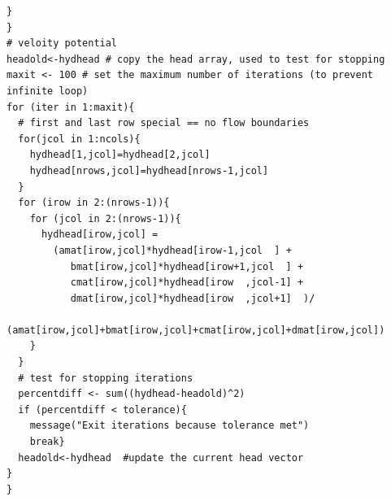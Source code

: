 \begin{lstlisting}[caption= R code demonstrating an Velocity Potential (Aquifer Head) Simulator for 2D Steady Flow.  This code fragment implements the contour plotting \\ , label=lst:velocitypotential]
  }
}
# veloity potential
headold<-hydhead # copy the head array, used to test for stopping 
maxit <- 100 # set the maximum number of iterations (to prevent infinite loop)
for (iter in 1:maxit){
  # first and last row special == no flow boundaries
  for(jcol in 1:ncols){
    hydhead[1,jcol]=hydhead[2,jcol]
    hydhead[nrows,jcol]=hydhead[nrows-1,jcol]
  }
  for (irow in 2:(nrows-1)){
    for (jcol in 2:(nrows-1)){
      hydhead[irow,jcol] = 
        (amat[irow,jcol]*hydhead[irow-1,jcol  ] +
           bmat[irow,jcol]*hydhead[irow+1,jcol  ] +
           cmat[irow,jcol]*hydhead[irow  ,jcol-1] +
           dmat[irow,jcol]*hydhead[irow  ,jcol+1]  )/
        (amat[irow,jcol]+bmat[irow,jcol]+cmat[irow,jcol]+dmat[irow,jcol])
    }
  }
  # test for stopping iterations
  percentdiff <- sum((hydhead-headold)^2)
  if (percentdiff < tolerance){
    message("Exit iterations because tolerance met")
    break}
  headold<-hydhead  #update the current head vector
}
}\end{lstlisting}
\clearpage

